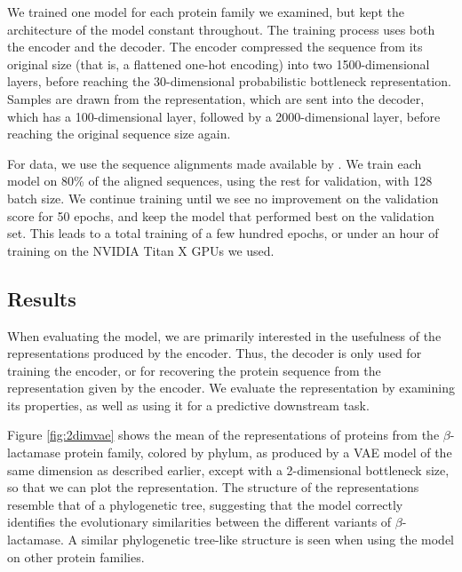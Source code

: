We trained one model for each protein family we examined, but kept the architecture of the model constant throughout. The training process uses both the encoder and the decoder. The encoder compressed the sequence from its original size (that is, a flattened one-hot encoding) into two 1500-dimensional layers, before reaching the 30-dimensional probabilistic bottleneck representation. Samples are drawn from the representation, which are sent into the decoder, which has a 100-dimensional layer, followed by a 2000-dimensional layer, before reaching the original sequence size again.

For data, we use the sequence alignments made available by \cite{riesselman2018deep}. We train each model on 80\% of the aligned sequences, using the rest for validation, with 128 batch size. We continue training until we see no improvement on the validation score for 50 epochs, and keep the model that performed best on the validation set. This leads to a total training of a few hundred epochs, or under an hour of training on the NVIDIA Titan X GPUs we used.


\subsection{Results}
When evaluating the model, we are primarily interested in the usefulness of the representations produced by the encoder. Thus, the decoder is only used for training the encoder, or for recovering the protein sequence from the representation given by the encoder. We evaluate the representation by examining its properties, as well as using it for a predictive downstream task.

Figure \ref{fig:2dimvae} shows the mean of the representations of proteins from the $\beta$-lactamase protein family, colored by phylum, as produced by a VAE model of the same dimension as described earlier, except with a 2-dimensional bottleneck size, so that we can plot the representation. The structure of the representations resemble that of a phylogenetic tree, suggesting that the model correctly identifies the evolutionary similarities between the different variants of $\beta$-lactamase. A similar phylogenetic tree-like structure is seen when using the model on other protein families.

